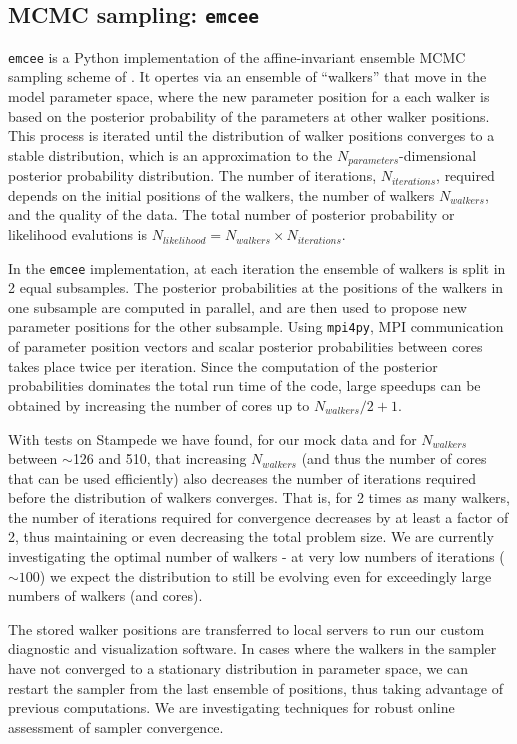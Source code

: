 \documentclass[11pt,preprint]{aastex}
\begin{document}
\subsection{MCMC sampling: \texttt{emcee}}
\label{sec:emcee}
\texttt{emcee} is a Python implementation of the affine-invariant ensemble MCMC sampling scheme of \cite{goodman_weare}.  It opertes via an ensemble of ``walkers'' that move in the model parameter space, where the new parameter position for a each walker is based on the posterior probability of the parameters at other walker positions.   This process is iterated until the distribution of walker positions converges to a stable distribution, which is an approximation to the $N_{parameters}$-dimensional posterior probability distribution. The number of iterations, $N_{iterations}$, required depends on the initial positions of the walkers, the number of walkers $N_{walkers}$, and the quality of the data.  The total number of posterior probability or likelihood evalutions is $N_{likelihood} = N_{walkers} \times N_{iterations}$.

In the \texttt{emcee} implementation, at each iteration the ensemble of walkers is split in 2 equal subsamples. The posterior probabilities at the positions of the walkers in one subsample are computed in parallel, and are then used to propose new parameter positions for the other subsample. Using \texttt{mpi4py}, MPI communication of parameter position vectors and scalar posterior probabilities between cores takes place twice per iteration. Since the computation of the posterior probabilities dominates the total run time of the code, large speedups can be obtained by increasing the number of cores up to $N_{walkers}/2 + 1$.  

With tests on Stampede we have found, for our mock data and for $N_{walkers}$ between $\sim$126 and 510, that increasing $N_{walkers}$ (and thus the number of cores that can be used efficiently) also decreases the number of iterations required before the distribution of walkers converges.  That is, for 2 times as many walkers, the number of iterations required for convergence decreases by at least a factor of 2, thus maintaining or even decreasing the total problem size.  We are currently investigating the optimal number of walkers - at very low numbers of iterations ($\sim 100$) we expect the distribution to still be evolving even for exceedingly large numbers of walkers (and cores).

The stored walker positions are transferred to local servers to run our custom diagnostic and visualization software.  
In cases where the walkers in the sampler have not converged to a stationary distribution in parameter space, we can restart the sampler from the last ensemble of positions, thus taking advantage of previous computations.  
We are investigating techniques for robust online assessment of sampler convergence.
\end{document}

